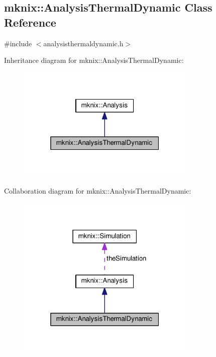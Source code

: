 \hypertarget{classmknix_1_1_analysis_thermal_dynamic}{}\subsection{mknix\+:\+:Analysis\+Thermal\+Dynamic Class Reference}
\label{classmknix_1_1_analysis_thermal_dynamic}


{\ttfamily \#include $<$analysisthermaldynamic.\+h$>$}



Inheritance diagram for mknix\+:\+:Analysis\+Thermal\+Dynamic\+:\nopagebreak
\begin{figure}[H]
\begin{center}
\leavevmode
\includegraphics[width=241pt]{df/da8/classmknix_1_1_analysis_thermal_dynamic__inherit__graph}
\end{center}
\end{figure}


Collaboration diagram for mknix\+:\+:Analysis\+Thermal\+Dynamic\+:\nopagebreak
\begin{figure}[H]
\begin{center}
\leavevmode
\includegraphics[width=241pt]{db/d46/classmknix_1_1_analysis_thermal_dynamic__coll__graph}
\end{center}
\end{figure}
